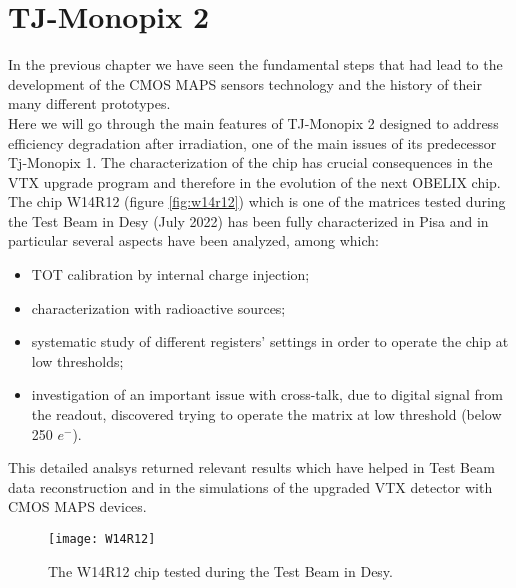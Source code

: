 
\begin{comment}
Normal/Cascode differ only by one transistor designed to increase gain

Voltage step applied trough injection capacitor
\end{comment}


\chapter{TJ-Monopix 2}

In the previous chapter we have seen the fundamental steps that had lead to the development of the CMOS MAPS sensors technology and the history of their many different prototypes. \\
Here we will go through the main features of TJ-Monopix 2 designed to address efficiency degradation after irradiation, one of the main issues of its predecessor Tj-Monopix 1. The characterization of the chip has crucial consequences in the VTX upgrade program and therefore in the evolution of the next OBELIX chip.\\
The chip W14R12 (figure \vref{fig:w14r12}) which is one of the matrices tested during the Test Beam in Desy (July 2022) has been fully characterized in Pisa and in particular several aspects have been analyzed, among which:

\begin{itemize}
\item TOT calibration by internal charge injection;
\item characterization with radioactive sources;
\item systematic study of different registers' settings in order to operate the chip at low thresholds;
\item investigation of an important issue with cross-talk, due to digital signal from the readout, discovered trying to operate the matrix at low threshold (below 250 $e^{-}$).
\end{itemize}

This detailed analsys returned relevant results which have helped in Test Beam data reconstruction and in the simulations of the upgraded VTX detector with CMOS MAPS devices.



\begin{figure}[h!]
\centering
\texttt{[image: W14R12]}
\caption{The W14R12 chip tested during the Test Beam in Desy.}
\label{fig:w14r12}
\end{figure}



